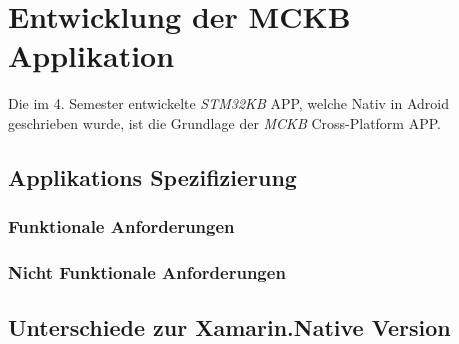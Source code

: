 %
%
% 
% 


\chapter{Entwicklung der MCKB Applikation}
\label{chap:xamarinformsdevelopment}

Die im 4. Semester entwickelte \textit{STM32KB} APP, welche Nativ in Adroid geschrieben wurde, ist die Grundlage der \textit{MCKB} Cross-Platform APP. 

\section{Applikations Spezifizierung}
\label{sec:mckspecs}

\subsection{Funktionale Anforderungen}
\label{sec:mckbfunkcspecs}

\subsection{Nicht Funktionale Anforderungen}
\label{sec:mckbnonfuncspecs}

\section{Unterschiede zur Xamarin.Native Version}
\label{sec:mckbspecs}